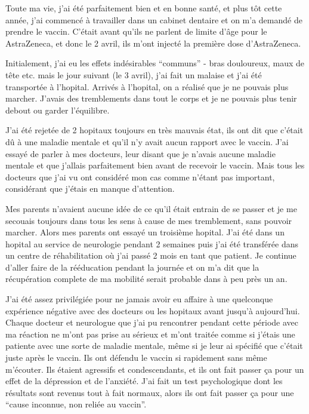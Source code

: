 Toute ma vie, j'ai été parfaitement bien et en bonne santé, et plus tôt cette
année, j'ai commencé à travailler dans un cabinet dentaire et on m'a demandé de
prendre le vaccin. C'était avant qu'ils ne parlent de limite d'âge pour le
AstraZeneca, et donc le 2 avril, ils m'ont injecté la première dose
d'AstraZeneca.

Initialement, j'ai eu les effets indésirables “communs” - bras douloureux, maux
de tête etc. mais le jour suivant (le 3 avril), j'ai fait un malaise et j'ai été
transportée à l'hopital. Arrivés à l'hopital, on a réalisé que je ne pouvais
plus marcher. J'avais des tremblements dans tout le corps et je ne pouvais plus
tenir debout ou garder l'équilibre.

J'ai été rejetée de 2 hopitaux toujours en très mauvais état, ils ont dit que
c'était dû à une maladie mentale et qu'il n'y avait aucun rapport avec le
vaccin. J'ai essayé de parler à mes docteurs, leur disant que je n'avais aucune
maladie mentale et que j'allais parfaitement bien avant de recevoir le
vaccin. Mais tous les docteurs que j'ai vu ont considéré mon cas comme n'étant
pas important, considérant que j'étais en manque d'attention.
                
Mes parents n'avaient aucune idée de ce qu'il était entrain de se passer et je
me secouais toujours dans tous les sens à cause de mes tremblement, sans pouvoir
marcher. Alors mes parents ont essayé un troisième hopital. J'ai été dans un
hopital au service de neurologie pendant 2 semaines puis j'ai été transférée
dans un centre de réhabilitation où j'ai passé 2 mois en tant que patient. Je
continue d'aller faire de la rééducation pendant la journée et on m'a dit que la
récupération complete de ma mobilité serait probable dans à peu près un an.

J'ai été assez privilégiée pour ne jamais avoir eu affaire à une quelconque
expérience négative avec des docteurs ou les hopitaux avant jusqu'à
aujourd'hui. Chaque docteur et neurologue que j'ai pu rencontrer pendant cette
période avec ma réaction ne m'ont pas prise au sérieux et m'ont traitée comme si
j'étais une patiente avec une sorte de maladie mentale, même si je leur ai
spécifié que c'était juste après le vaccin. Ils ont défendu le vaccin si
rapidement sans même m'écouter. Ils étaient agressifs et condescendants, et ils
ont fait passer ça pour un effet de la dépression et de l'anxiété. J'ai fait un
test psychologique dont les résultats sont revenus tout à fait normaux, alors
ils ont fait passer ça pour une “cause inconnue, non reliée au vaccin”.

